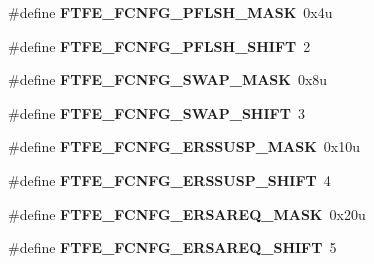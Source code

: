 \begin{DoxyCompactItemize}
\item 
\hypertarget{group___f_t_f_e___register___masks_ga22150d49ad85cccc858cc662646709fc}{}\#define {\bfseries F\+T\+F\+E\+\_\+\+F\+C\+N\+F\+G\+\_\+\+P\+F\+L\+S\+H\+\_\+\+M\+A\+S\+K}~0x4u\label{group___f_t_f_e___register___masks_ga22150d49ad85cccc858cc662646709fc}

\item 
\hypertarget{group___f_t_f_e___register___masks_gab11680c8c2af4bc8ca038d6653aa62f3}{}\#define {\bfseries F\+T\+F\+E\+\_\+\+F\+C\+N\+F\+G\+\_\+\+P\+F\+L\+S\+H\+\_\+\+S\+H\+I\+F\+T}~2\label{group___f_t_f_e___register___masks_gab11680c8c2af4bc8ca038d6653aa62f3}

\item 
\hypertarget{group___f_t_f_e___register___masks_ga3c2d728cfbe0780822279facccb6ea7b}{}\#define {\bfseries F\+T\+F\+E\+\_\+\+F\+C\+N\+F\+G\+\_\+\+S\+W\+A\+P\+\_\+\+M\+A\+S\+K}~0x8u\label{group___f_t_f_e___register___masks_ga3c2d728cfbe0780822279facccb6ea7b}

\item 
\hypertarget{group___f_t_f_e___register___masks_ga9cbd4373a827c093995738f21d5ec753}{}\#define {\bfseries F\+T\+F\+E\+\_\+\+F\+C\+N\+F\+G\+\_\+\+S\+W\+A\+P\+\_\+\+S\+H\+I\+F\+T}~3\label{group___f_t_f_e___register___masks_ga9cbd4373a827c093995738f21d5ec753}

\item 
\hypertarget{group___f_t_f_e___register___masks_ga18ad048f9a72d6d052efabc10f60b3a5}{}\#define {\bfseries F\+T\+F\+E\+\_\+\+F\+C\+N\+F\+G\+\_\+\+E\+R\+S\+S\+U\+S\+P\+\_\+\+M\+A\+S\+K}~0x10u\label{group___f_t_f_e___register___masks_ga18ad048f9a72d6d052efabc10f60b3a5}

\item 
\hypertarget{group___f_t_f_e___register___masks_ga14c085de5677c4af68c1bec36d7b78c3}{}\#define {\bfseries F\+T\+F\+E\+\_\+\+F\+C\+N\+F\+G\+\_\+\+E\+R\+S\+S\+U\+S\+P\+\_\+\+S\+H\+I\+F\+T}~4\label{group___f_t_f_e___register___masks_ga14c085de5677c4af68c1bec36d7b78c3}

\item 
\hypertarget{group___f_t_f_e___register___masks_ga821b3e77482bd12d4807f67cceeb214b}{}\#define {\bfseries F\+T\+F\+E\+\_\+\+F\+C\+N\+F\+G\+\_\+\+E\+R\+S\+A\+R\+E\+Q\+\_\+\+M\+A\+S\+K}~0x20u\label{group___f_t_f_e___register___masks_ga821b3e77482bd12d4807f67cceeb214b}

\item 
\hypertarget{group___f_t_f_e___register___masks_ga3def3907e314c84b2b3c0490891c8bc4}{}\#define {\bfseries F\+T\+F\+E\+\_\+\+F\+C\+N\+F\+G\+\_\+\+E\+R\+S\+A\+R\+E\+Q\+\_\+\+S\+H\+I\+F\+T}~5\label{group___f_t_f_e___register___masks_ga3def3907e314c84b2b3c0490891c8bc4}


\end{DoxyCompactItemize}
